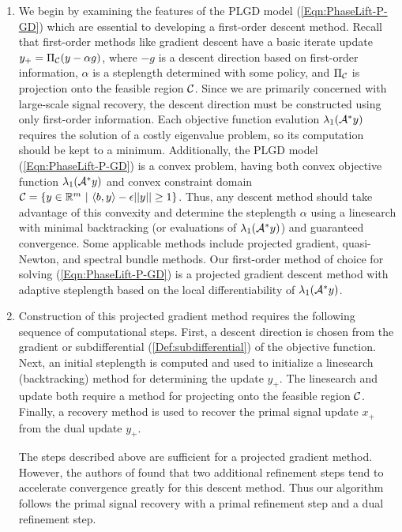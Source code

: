 \begin{enumerate}


\item

We begin by examining the features of the PLGD model (\ref{Eqn:PhaseLift-P-GD}) which are essential to developing a first-order descent method.  Recall that first-order methods like gradient descent have a basic iterate update $y_+ = \Pi_{\mathcal C}(y - \alpha g)$, where $-g$ is a descent direction based on first-order information, $\alpha$ is a steplength determined with some policy, and $\Pi_{\mathcal C}$ is projection onto the feasible region ${\mathcal C}$.  Since we are primarily concerned with large-scale signal recovery, the descent direction must be constructed using only first-order information.  Each objective function evalution $\lambda_1({\mathcal A}^*y)$ requires the solution of a costly eigenvalue problem, so its computation should be kept to a minimum.  Additionally, the PLGD model (\ref{Eqn:PhaseLift-P-GD}) is a convex problem, having both convex objective function $\lambda_1({\mathcal A}^* y)$ and convex constraint domain ${\mathcal C} = \{ y \in \mathbb{R}^m \ | \ \langle b, y \rangle - \epsilon ||y|| \geq 1 \}$.   Thus, any descent method should take advantage of this convexity and determine the steplength $\alpha$ using a linesearch with minimal backtracking (or evaluations of $\lambda_1({\mathcal A}^*y)$) and guaranteed convergence.  Some applicable methods include projected gradient, quasi-Newton, and spectral bundle methods.  Our first-order method of choice for solving (\ref{Eqn:PhaseLift-P-GD}) is a projected gradient descent method with adaptive steplength based on the local differentiability of $\lambda_1({\mathcal A}^* y)$.


\item

Construction of this projected gradient method requires the following sequence of computational steps.  First, a descent direction is chosen from the gradient or subdifferential (\ref{Def:subdifferential}) of the objective function.  Next, an initial steplength is computed and used to initialize a linesearch (backtracking) method for determining the update $y_+$.  The linesearch and update both require a method for projecting onto the feasible region ${\mathcal C}$.  Finally, a recovery method is used to recover the primal signal update $x_+$ from the dual update $y_+$.

The steps described above are sufficient for a projected gradient method.  However, the authors of \cite{DBLP:journals/siamsc/FriedlanderM16} found that two additional refinement steps tend to accelerate convergence greatly for this descent method.  Thus our algorithm follows the primal signal recovery with a primal refinement step and a dual refinement step.



\end{enumerate}
